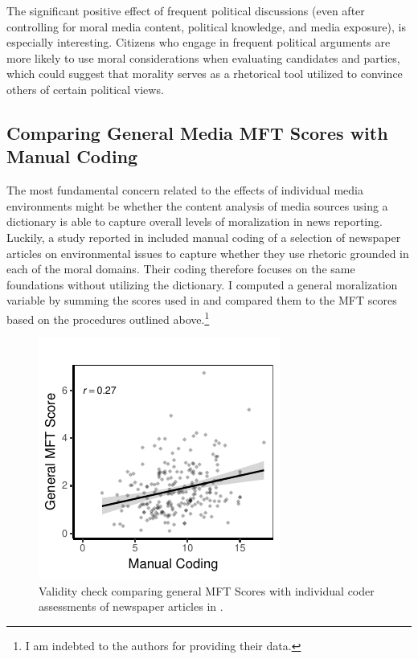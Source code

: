 \documentclass[12pt]{article}
\begin{document}
The significant positive effect of frequent political discussions (even after controlling for moral media content, political knowledge, and media exposure), is especially interesting. Citizens who engage in frequent political arguments are more likely to use moral considerations when evaluating candidates and parties, which could suggest that morality serves as a rhetorical tool utilized to convince others of certain political views.


\clearpage
\subsection{Comparing General Media MFT Scores with Manual Coding}

The most fundamental concern related to the effects of individual media environments might be whether the content analysis of media sources using a dictionary is able to capture overall levels of moralization in news reporting. Luckily, a study reported in \citet{feinberg2013moral} included manual coding of a selection of newspaper articles on environmental issues to capture whether they use rhetoric grounded in each of the moral domains. Their coding therefore focuses on the same foundations without utilizing the dictionary. I computed a general moralization variable by summing the scores used in \citet{feinberg2013moral} and compared them to the MFT scores based on the procedures outlined above.\footnote{I am indebted to the authors for providing their data.}

\begin{figure}[ht]\centering
\includegraphics{../calc/fig/feinberg_general.pdf}
\caption{Validity check comparing general MFT Scores with individual coder assessments of newspaper articles in \citet{feinberg2013moral}.}\label{fig:ols_feinberg}
\end{figure}
\end{document}
